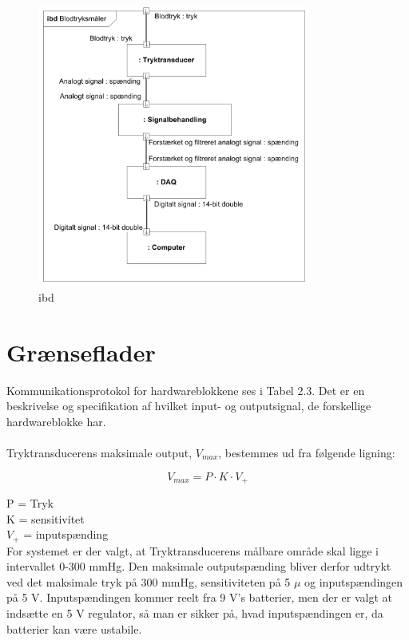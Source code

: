 \begin{figure}[H]
	\centering
	\includegraphics[width=0.8\textwidth]{Figurer/Snip20151209_72}
	\caption{ibd}
	\label{fig:ibd}
\end{figure}

\section{Grænseflader}
Kommunikationsprotokol for hardwareblokkene ses i Tabel 2.3. Det er en beskrivelse og specifikation af hvilket input- og outputsignal, de forskellige hardwareblokke har. 
\\  \\
Tryktransducerens maksimale output, $V_{max}$, bestemmes ud fra følgende ligning:

\begin{equation}
	V_{max} = P \cdot K \cdot V_{+}
\end{equation}

P = Tryk\\
K = sensitivitet\\
$V_{+}$ = inputspænding\\

For systemet er der valgt, at Tryktransducerens målbare område skal ligge i intervallet 0-300 mmHg. Den maksimale outputspænding bliver derfor udtrykt ved det maksimale tryk på 300 mmHg, sensitiviteten på 5 $\mu$ og inputspændingen på 5 V. Inputspændingen kommer reelt fra 9 V's batterier, men der er valgt at indsætte en 5 V regulator, så man er sikker på, hvad inputspændingen er, da batterier kan være ustabile.  


